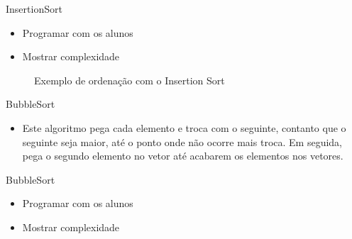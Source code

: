 \begin{frame}
	\begin{block}{InsertionSort}
		\begin{itemize}
			\item Programar com os alunos
			\item Mostrar complexidade
		\end{itemize}
	\end{block}
\end{frame}


\begin{frame}{}
	\begin{figure}[h!]
		\centering    
		  \caption{Exemplo de ordenação com o Insertion Sort}
	 \end{figure} 
\end{frame}

\begin{frame}
	\begin{block}{BubbleSort}
		\begin{itemize}
			\item Este algoritmo pega cada elemento e troca com o seguinte, contanto que o seguinte seja maior, até o ponto onde não ocorre mais troca. Em seguida, pega o segundo elemento no vetor até acabarem os elementos nos vetores.
		\end{itemize}
	\end{block}
\end{frame}

\begin{frame}
	\begin{block}{BubbleSort}
		\begin{itemize}
			\item Programar com os alunos
			\item Mostrar complexidade
		\end{itemize}
	\end{block}
\end{frame}

